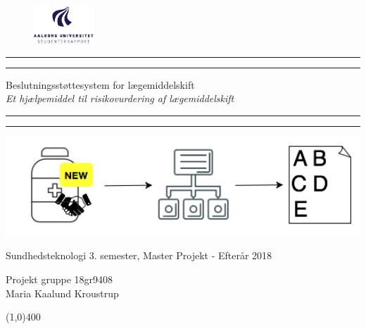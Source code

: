 \clearpage
\thispagestyle{empty}

\begin{figure}[H]
	\raggedleft
	\includegraphics[width=0.2\textwidth]{billeder/aau_logo_da.pdf}
\end{figure} 

\begin{center}	
	\rule{\textwidth}{1.6pt}\vspace*{-\baselineskip}\vspace*{2pt} %
	\rule{\textwidth}{0.4pt} %
	
	\vspace{0.75\baselineskip} %
	
	{\huge Beslutningsstøttesystem for lægemiddelskift} \\ \vspace{3mm}%
	{\Large\textit{Et hjælpemiddel til risikovurdering af lægemiddelskift}}
	\vspace{0.75\baselineskip} %
	
	\rule{\textwidth}{0.4pt}\vspace*{-\baselineskip}\vspace{3.2pt} %
	\rule{\textwidth}{1.6pt} %
	
	\vspace{3.5\baselineskip} %
		\includegraphics[width=1\textwidth]{Statusseminar/statusforside.png} \\
		\vspace{3cm}
	 		\begin{Large}
	 		Sundhedsteknologi 3. semester, Master Projekt - Efterår 2018\\
		\vspace{1cm}
			\end{Large}
	{\large Projekt gruppe 18gr9408 \\
	Maria Kaalund Kroustrup}
\end{center}
\vspace*{\fill}

\begin{center}
	\line(1,0){400}
\end{center}



